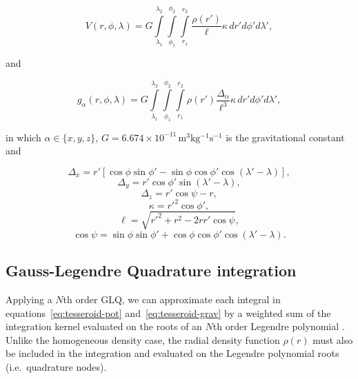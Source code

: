 \documentclass[extra, referee]{gji}
\begin{document}
\begin{equation}
    V(r,\phi,\lambda) = G
    \int\limits_{\lambda_1}^{\lambda_2}
    \int\limits_{\phi_1}^{\phi_2}
    \int\limits_{r_1}^{r_2}
    \frac{\rho(r')}{\ell} \kappa \,  dr' d\phi' d\lambda',
\label{eq:tesseroid-pot}
\end{equation}

\noindent and

\begin{equation}
    g_{\alpha}(r,\phi,\lambda) = G
    \int\limits_{\lambda_1}^{\lambda_2}
    \int\limits_{\phi_1}^{\phi_2}
    \int\limits_{r_1}^{r_2}
    \rho(r') \frac{\Delta_\alpha}{\ell^3}
    \kappa \, dr' d\phi' d\lambda',
\label{eq:tesseroid-grav}
\end{equation}

\noindent in which $\alpha \in \{x, y, z\}$,
$G = 6.674\times10^{-11}\, \text{m$^3$kg$^{-1}$s$^{-1}$}$ is the gravitational constant
and

\begin{equation}
    \Delta_x = r'[\cos\phi\sin\phi' - \sin\phi\cos\phi'
               \cos(\lambda' - \lambda)],
\end{equation}
\begin{equation}
    \Delta_y = r' \cos \phi' \sin(\lambda' - \lambda),
\end{equation}
\begin{equation}
    \Delta_z = r' \cos \psi - r,
\end{equation}
\begin{equation}
    \kappa = {r'}^2 \cos \phi',
\end{equation}
\begin{equation}
    \ell = \sqrt{{r'}^2 + r^2 - 2 r r' \cos \psi},
\label{eq:ell}
\end{equation}
\begin{equation}
    \cos\psi = \sin\phi\sin\phi' + \cos\phi\cos\phi'
                 \cos(\lambda' - \lambda).
\label{eq:cospsi}
\end{equation}


\subsection{Gauss-Legendre Quadrature integration}

Applying a $N$th order GLQ, we can approximate each integral in
equations~\ref{eq:tesseroid-pot} and~\ref{eq:tesseroid-grav} by a weighted sum of the
integration kernel evaluated on the roots of an $N$th order Legendre polynomial
\citep[p.~390]{Hildebrand1987}.
Unlike the homogeneous density case, the radial density function $\rho(r)$ must also be
included in the integration and evaluated on the Legendre polynomial roots
(i.e.~quadrature nodes).
\end{document}
